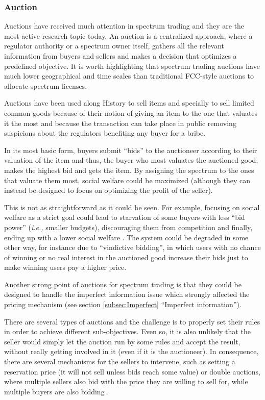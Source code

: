 \subsubsection{Auction}

Auctions have received much attention in spectrum trading and they are the most active research topic today. An auction is a centralized approach, where a regulator authority or a spectrum owner itself, gathers all the relevant information from buyers and sellers and makes a decision that optimizes a predefined objective. It is worth highlighting that spectrum trading auctions have much lower geographical and time scales than traditional FCC-style auctions to allocate spectrum licenses. 

Auctions have been used along History to sell items and specially to sell limited common goods \cite{ref:Courcoubetis2003,ref:Liu2010} because of their notion of giving an item to the one that valuates it the most and because the transaction can take place in public removing suspicions about the regulators benefiting any buyer for a bribe.

In its most basic form, buyers submit ``bids'' to the auctioneer according to their valuation of the item and thus, the buyer who most valuates the auctioned good, makes the highest bid and gets the item. By assigning the spectrum to the ones that valuate them most, social welfare could be maximized (although they can instead be designed to focus on optimizing the profit of the seller). 

This is not as straightforward as it could be seen. For example, focusing on social welfare as a strict goal could lead to starvation of some buyers with less ``bid power'' (\textit{i.e.,} smaller budgets), discouraging them from competition and finally, ending up with a lower social welfare \cite{ref:Gopinathan2011}. The system could be degraded in some other way, for instance due to ``vindictive bidding'', in which users with no chance of winning or no real interest in the auctioned good increase their bids just to make winning users pay a higher price. 

Another strong point of auctions for spectrum trading is that they could be designed to handle the imperfect information issue which strongly affected the pricing mechanism (see section \ref{subsec:Imperfect} ``Imperfect information'').

There are several types of auctions and the challenge is to properly set their rules in order to achieve different sub-objectives. Even so, it is also unlikely that the seller would simply let the auction run by some rules and accept the result, without really getting involved in it (even if it is the auctioneer). In consequence, there are several mechanisms for the sellers to intervene, such as setting a reservation price (it will not sell unless bids reach some value) or double auctions, where multiple sellers also bid with the price they are willing to sell for, while multiple buyers are also bidding \cite{ref:Wang2010_TODA,ref:Gao2011_MAP,ref:Xu2010}.

